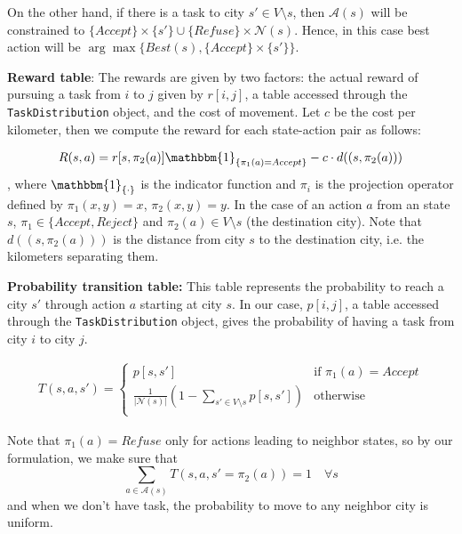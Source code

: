 \documentclass[11pt]{article}
\begin{document}
On the other hand, if there is a task to city $s'\in V\setminus s$, then $\mathcal{A}(s)$ will be constrained to $\{Accept\} \times \{s'\} \cup \{Refuse\} \times \mathcal{N}(s)$. Hence, in this case best action will be $\arg\max \{Best(s), \{Accept\} \times \{s'\}\}$. 

\textbf{Reward table}: The rewards are given by two factors: the actual reward of pursuing a task from $i$ to $j$ given by $r[i,j]$, a table accessed through the \texttt{TaskDistribution} object, and the cost of movement. Let $c$ be the cost per kilometer, then we compute the reward for each state-action pair as follows:

\begin{align}
    R(s, a) = r[s, \pi_2(a)] \mathbbm{1}_{\{\pi_1(a) = Accept\}}- c \cdot d((s, \pi_2(a)))
\end{align}
, where $\mathbbm{1}_{\{\cdot\}}$ is the indicator function and $\pi_i$ is the projection operator defined by $\pi_1(x, y) = x$, $\pi_2(x, y) = y$. In the case of an action $a$ from an state $s$, $\pi_1\in \{Accept, Reject\}$ and $\pi_2(a) \in V \setminus s$ (the destination city). Note that $d((s, \pi_2(a)))$ is the distance from city $s$ to the destination city, i.e. the kilometers separating them.


\textbf{Probability transition table:} This table represents the probability to reach a city $s'$ through action $a$ starting at city $s$. In our case, $p[i,j]$, a table accessed through the \texttt{TaskDistribution} object, gives the probability of having a task from city $i$ to city $j$.

\begin{align}
    T(s,a,s')=
    \begin{cases}
        p[s,s'] & \text{if } \pi_1(a)=Accept \\
        \frac{1}{|\mathcal{N}(s)|}(1 - \sum_{s'\in V\setminus s} p[s,s']) &\text{otherwise}\\
    \end{cases}
\end{align}

Note that $\pi_1(a)=Refuse$ only for actions leading to neighbor states, so by our formulation, we make sure that
\begin{displaymath}
    \sum_{a \in\mathcal{A}(s)} T(s,a,s'=\pi_2(a))=1 \quad  \forall s
\end{displaymath}
and when we don't have task, the probability to move to any neighbor city is uniform.
\end{document}
